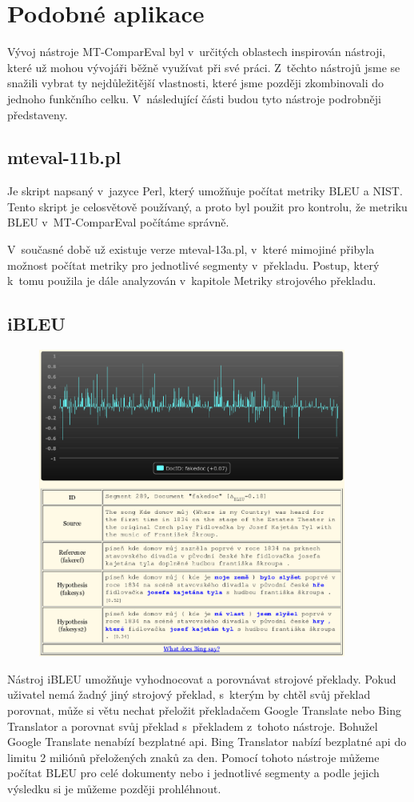 \section{Podobné aplikace}
Vývoj nástroje MT-ComparEval byl v~určitých oblastech inspirován nástroji,
  které už mohou vývojáři běžně využívat při své práci.
Z~těchto nástrojů jsme se snažili vybrat ty nejdůležitější vlastnosti,
  které jsme později zkombinovali do jednoho funkčního celku.
V~následující části budou tyto nástroje podrobněji představeny.

\subsection{mteval-11b.pl}
Je skript napsaný v~jazyce Perl,
  který umožňuje počítat metriky BLEU a NIST.
Tento skript je celosvětově používaný,
  a proto byl použit pro kontrolu,
  že metriku BLEU v~MT-ComparEval počítáme správně.

V~současné době už existuje verze mteval-13a.pl,
  v~které mimojiné přibyla možnost počítat metriky pro jednotlivé segmenty v~překladu.
Postup, který k~tomu použila je dále analyzován v~kapitole Metriky strojového překladu.

\subsection{iBLEU}
\begin{figure}[h]
  \center
  \includegraphics[width=0.9\textwidth]{img/ibleu.eps}
\end{figure}
Nástroj iBLEU umožňuje vyhodnocovat a porovnávat strojové překlady.
Pokud uživatel nemá žadný jiný strojový překlad,
  s~kterým by chtěl svůj překlad porovnat,
  může si větu nechat přeložit překladačem Google Translate nebo Bing Translator
  a porovnat svůj překlad s~překladem z~tohoto nástroje.
Bohužel Google Translate nenabízí bezplatné api.
Bing Translator nabízí bezplatné api do limitu 2 miliónů přeložených znaků za den.
Pomocí tohoto nástroje můžeme počítat BLEU pro celé dokumenty nebo i jednotlivé segmenty
  a podle jejich výsledku si je můžeme později prohléhnout.

